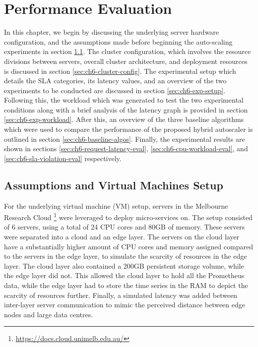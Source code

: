 \clearpage

\def\chaptertitle{Performance Evaluation}

\lhead{\emph{\chaptertitle}}

\chapter{\chaptertitle}
\label{ch:performance-evaluation}

In this chapter, we begin by discussing the underlying server hardware configuration, and the assumptions made before beginning the auto-scaling experiments in section \ref{sec:ch6-hardware-assumptions}. The cluster configuration, which involves the resource divisions between servers, overall cluster architecture, and deployment resources is discussed in section \ref{sec:ch6-cluster-config}. The experimental setup which details the SLA categories, its latency values, and an overview of the two experiments to be conducted are discussed in section \ref{sec:ch6-exp-setup}. Following this, the workload which was generated to test the two experimental conditions along with a brief analysis of the latency graph is provided in section \ref{sec:ch6-exp-workload}. After this, an overview of the three baseline algorithms which were used to compare the performance of the proposed hybrid autoscaler is outlined in section \ref{sec:ch6-baseline-algos}. Finally, the experimental results are shown in sections \ref{sec:ch6-request-latency-eval}, \ref{sec:ch6-cpu-workload-eval}, and \ref{sec:ch6-sla-violation-eval} respectively.

\section{Assumptions and Virtual Machines Setup}
\label{sec:ch6-hardware-assumptions}

For the underlying virtual machine (VM) setup, servers in the Melbourne Research Cloud \footnote{\url{https://docs.cloud.unimelb.edu.au/}} were leveraged to deploy micro-services on. The setup consisted of 6 servers, using a total of 24 CPU cores and 80GB of memory. These servers were separated into a cloud and an edge layer. The servers on the cloud layer have a substantially higher amount of CPU cores and memory assigned compared to the servers in the edge layer, to simulate the scarcity of resources in the edge layer. The cloud layer also contained a 200GB persistent storage volume, while the edge layer did not. This allowed the cloud layer to hold all the Prometheus data, while the edge layer had to store the time series in the RAM to depict the scarcity of resources further. Finally, a simulated latency was added between inter-layer server communication to mimic the perceived distance between edge nodes and large data centres.\par

